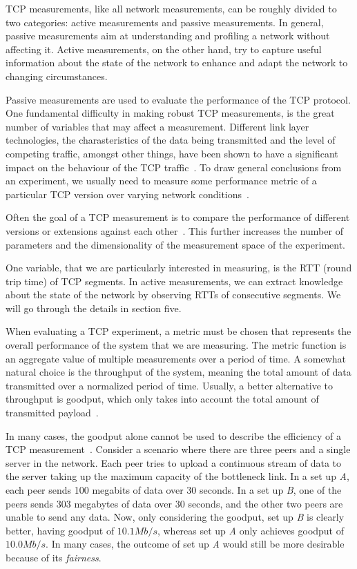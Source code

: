 TCP measurements, like all network measurements, can be roughly divided to two categories: active measurements and passive measurements. In general, passive measurements aim at understanding and profiling a network without affecting it. Active measurements, on the other hand, try to capture useful information about the state of the network to enhance and adapt the network to changing circumstances.   

Passive measurements are used to evaluate the performance of the TCP protocol. One fundamental difficulty in making robust TCP measurements, is the great number of variables that may affect a measurement. Different link layer technologies, the charasteristics of the data being transmitted and the level of competing traffic, amongst other things, have been shown to have a significant impact on the behaviour of the TCP traffic~\cite{Allman99}. To draw general conclusions from an experiment, we usually need to measure some performance metric of a particular TCP version over varying network conditions~\cite{Allman99}.  

Often the goal of a TCP measurement is to compare the performance of different versions or extensions against each other~\cite{Allman99}. This further increases the number of parameters and the dimensionality of the measurement space of the experiment.

One variable, that we are particularly interested in measuring, is the RTT (round trip time) of TCP segments. In active measurements, we can extract knowledge about the state of the network by observing RTTs of consecutive segments. We will go through the details in section five. 

When evaluating a TCP experiment, a metric must be chosen that represents the overall performance of the system that we are measuring. The metric function is an aggregate value of multiple measurements over a period of time. A somewhat natural choice is the throughput of the system, meaning the total amount of data transmitted over a normalized period of time. Usually, a better alternative to throughput is goodput, which only takes into account the total amount of transmitted payload~\cite{Allman99}. 

In many cases, the goodput alone cannot be used to describe the efficiency of a TCP measurement~\cite{Allman99}. Consider a scenario where there are three peers and a single server in the network. Each peer tries to upload a continuous stream of data to the server taking up the maximum capacity of the bottleneck link. In a set up \textit{A}, each peer sends 100 megabits of data over 30 seconds. In a set up \textit{B}, one of the peers sends 303 megabytes of data over 30 seconds, and the other two peers are unable to send any data. Now, only considering the goodput, set up \textit{B} is clearly better, having goodput of $10.1Mb/s$, whereas set up \textit{A} only achieves goodput of $10.0Mb/s$. In many cases, the outcome of set up \textit{A} would still be more desirable because of its \textit{fairness}.

